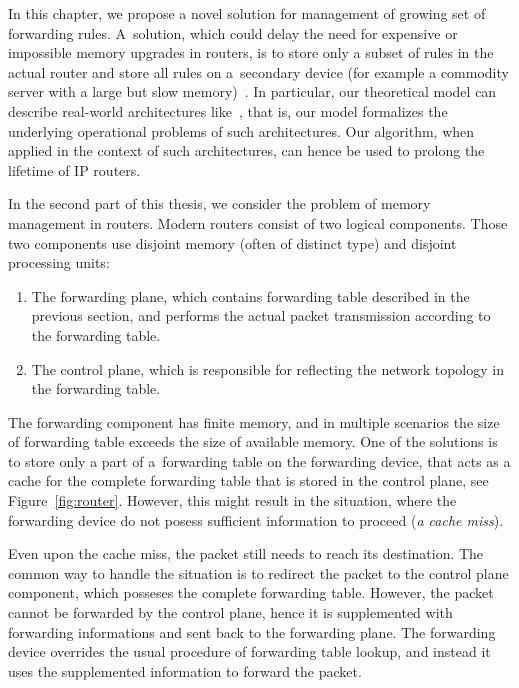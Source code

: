 In this chapter, we propose a novel solution for management of growing set of forwarding rules.
A~solution, which could delay
the need for expensive or impossible memory upgrades in routers, is to store
only a subset of rules in the actual router and store all rules on a~secondary
device (for example a commodity server with a large but slow
memory)~\cite{cacheflow,route-caching-flat,prefix-caching,fib-caching-non-overlapping,fibium-zipf}.
In particular, our
theoretical model can describe real-world architectures
like~\cite{cacheflow,fibium-zipf},
that is, our model formalizes the underlying operational
problems of such architectures. Our 
algorithm, when applied in the context of such architectures, can 
hence be used to prolong the lifetime of IP routers.


In the second part of this thesis, we consider the problem of memory management in routers.
Modern routers consist of two logical components. Those two components use disjoint memory (often of distinct type) and disjoint processing units:
\begin{enumerate}
  \item The forwarding plane, which  contains forwarding table described in the previous section, and performs the actual packet transmission according to the forwarding table.
  \item The control plane, which is responsible for reflecting the network topology in the forwarding table.
\end{enumerate}

The forwarding component has finite memory, and in multiple scenarios the size of forwarding table exceeds the size of available memory.
One of the solutions is to store only a part of a~forwarding table on the forwarding device, that acts as a cache for the complete forwarding table that is stored in the control plane, see Figure~\ref{fig:router}.
However, this might result in the situation, where the forwarding device do not posess sufficient information to proceed (\emph{a cache miss}).

Even upon the cache miss, the packet still needs to reach its destination.
The common way to handle the situation is to redirect the packet to the control plane component, which posseses the complete forwarding table.
However, the packet cannot be forwarded by the control plane, hence it is supplemented with forwarding informations and sent back to the forwarding plane.
The forwarding device overrides the usual procedure of forwarding table lookup, and instead it uses the supplemented information to forward the packet.


